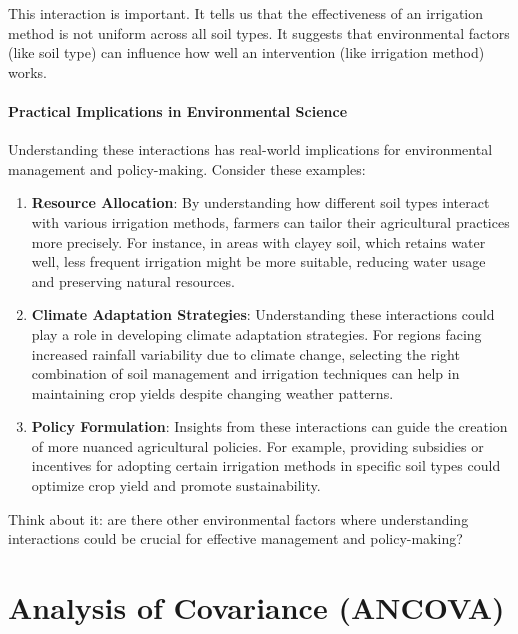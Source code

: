 \documentclass[
  letterpaper,
  DIV=11,
  numbers=noendperiod]{scrreprt}
\begin{document}
This interaction is important. It tells us that the effectiveness of an
irrigation method is not uniform across all soil types. It suggests that
environmental factors (like soil type) can influence how well an
intervention (like irrigation method) works.

\subsubsection{Practical Implications in Environmental
Science}\label{practical-implications-in-environmental-science}

Understanding these interactions has real-world implications for
environmental management and policy-making. Consider these examples:

\begin{enumerate}
\def\labelenumi{\arabic{enumi}.}
\item
  \textbf{Resource Allocation}: By understanding how different soil
  types interact with various irrigation methods, farmers can tailor
  their agricultural practices more precisely. For instance, in areas
  with clayey soil, which retains water well, less frequent irrigation
  might be more suitable, reducing water usage and preserving natural
  resources.
\item
  \textbf{Climate Adaptation Strategies}: Understanding these
  interactions could play a role in developing climate adaptation
  strategies. For regions facing increased rainfall variability due to
  climate change, selecting the right combination of soil management and
  irrigation techniques can help in maintaining crop yields despite
  changing weather patterns.
\item
  \textbf{Policy Formulation}: Insights from these interactions can
  guide the creation of more nuanced agricultural policies. For example,
  providing subsidies or incentives for adopting certain irrigation
  methods in specific soil types could optimize crop yield and promote
  sustainability.
\end{enumerate}

Think about it: are there other environmental factors where
understanding interactions could be crucial for effective management and
policy-making?


\chapter{Analysis of Covariance
(ANCOVA)}\label{analysis-of-covariance-ancova}
\end{document}
